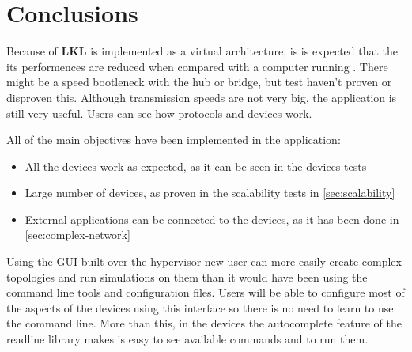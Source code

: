 \chapter{Conclusions}
\label{chapter:conclusions}

Because of \textbf{LKL} is implemented as a virtual architecture, is is expected
that the its performences are reduced when compared with a computer running .
There might be a speed bootleneck with the hub or bridge, but test haven't proven or disproven
this. Although transmission speeds are not very big, the application is still very useful. Users can
see how protocols and devices work.

All of the main objectives have been implemented in the application:
\begin{itemize}
	\item All the devices work as expected, as it can be seen in the devices tests
	\item Large number of devices, as proven in the scalability tests in \ref{sec:scalability}
	\item External applications can be connected to the \textbf{\project} devices, as it has
been done in \ref{sec:complex-network}
\end{itemize}

Using the GUI built over the hypervisor new user can more easily create complex topologies and run simulations
on them than it would have been using the command line tools and configuration files. Users will be able to configure
most of the aspects of the devices using this interface so there is no need to learn to use the command line. More than
this, in the devices the autocomplete feature of the readline library makes is easy to see available commands and
to run them.
